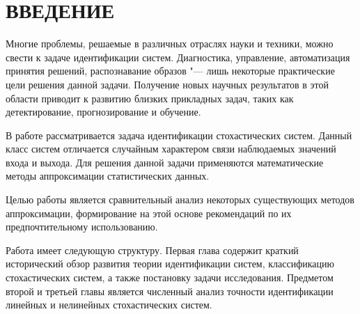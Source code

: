 \chapter*{ВВЕДЕНИЕ}

Многие проблемы, решаемые в различных отраслях науки и техники,
можно свести к задаче идентификации систем.
Диагностика, управление, автоматизация принятия решений, распознавание образов
"--- лишь некоторые практические цели решения данной задачи.
Получение новых научных результатов в этой области приводит к
развитию близких прикладных задач,
таких как детектирование, прогнозирование и обучение.

В работе рассматривается задача идентификации стохастических систем.
Данный класс систем отличается случайным характером связи наблюдаемых
значений входа и выхода.
Для решения данной задачи применяются математические методы
аппроксимации статистических данных.

Целью работы является сравнительный анализ некоторых существующих методов аппроксимации,
формирование на этой основе рекомендаций по их предпочтительному использованию.

Работа имеет следующую структуру.
Первая глава содержит краткий исторический обзор развития теории идентификации систем,
классификацию стохастических систем, а также постановку задачи исследования.
Предметом второй и третьей главы является численный анализ точности идентификации
линейных и нелинейных стохастических систем.